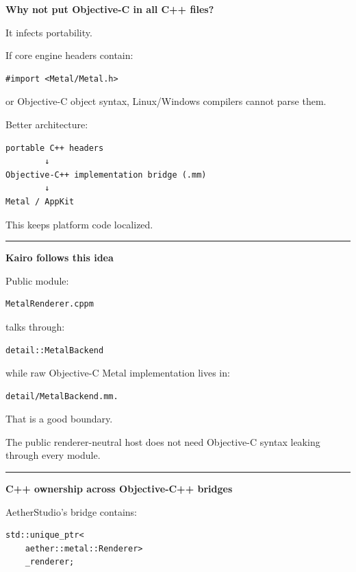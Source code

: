 \textbf{Why not put Objective-C in all C++ files?}

It infects portability.

If core engine headers contain:

\begin{verbatim}
#import <Metal/Metal.h>
\end{verbatim}

or Objective-C object syntax, Linux/Windows compilers cannot parse them.

Better architecture:

\begin{verbatim}
portable C++ headers
        ↓
Objective-C++ implementation bridge (.mm)
        ↓
Metal / AppKit
\end{verbatim}

This keeps platform code localized.

\begin{center}\rule{0.5\linewidth}{0.5pt}\end{center}

\textbf{Kairo follows this idea}

Public module:

\begin{verbatim}
MetalRenderer.cppm
\end{verbatim}

talks through:

\begin{verbatim}
detail::MetalBackend
\end{verbatim}

while raw Objective-C Metal implementation lives in:

\begin{verbatim}
detail/MetalBackend.mm.
\end{verbatim}

That is a good boundary.

The public renderer-neutral host does not need Objective-C syntax leaking through every module.

\begin{center}\rule{0.5\linewidth}{0.5pt}\end{center}

\textbf{C++ ownership across Objective-C++ bridges}

AetherStudio's bridge contains:

\begin{verbatim}
std::unique_ptr<
    aether::metal::Renderer>
    _renderer;
\end{verbatim}

